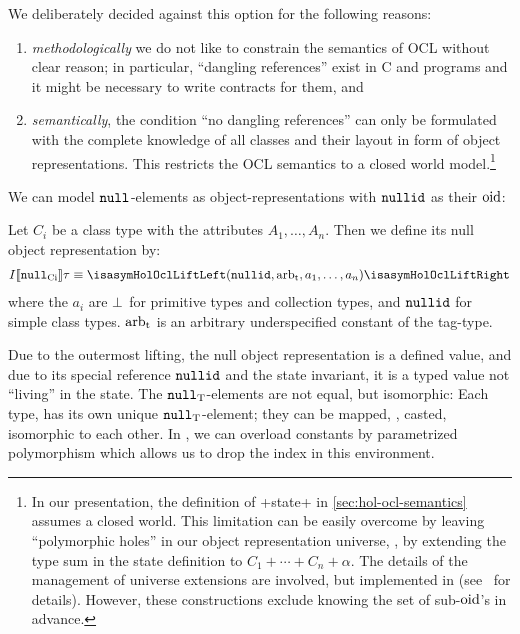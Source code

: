 We deliberately decided against this option for the following reasons:
\begin{enumerate}
\item \emph{methodologically} we do not like to constrain the semantics of OCL
  without clear reason; in particular, ``dangling references'' exist in C and
  \Cpp{} programs and it might be necessary to write contracts for them, and
\item \emph{semantically}, the condition ``no dangling references'' can only be
  formulated with the complete knowledge of all classes and their layout in
  form of object representations.  This restricts the OCL semantics to a closed
  world model.\footnote{In our presentation, the definition of \inlineocl+state+
    in \autoref{sec:hol-ocl-semantics} assumes a closed world. This limitation
    can be easily overcome by leaving ``polymorphic holes'' in our object
    representation universe, \ie, by extending the type sum in the state
    definition to $C_1 + \cdots + C_n + \alpha$.  The details of the management
    of universe extensions are involved, but implemented in \holocl
    (see~\cite{brucker.ea:extensible:2008-b} for details). However, these
    constructions exclude knowing the set of sub-$\mathrm{oid}$'s in advance.}
\end{enumerate} We can model ${\mathtt{null}_\text{{}}}$-elements as object-representations
with $\mathtt{nullid}$ as their $\mathrm{oid}$:
\begin{definition}
  Let $C_i$ be a class type with the attributes $A_1, \ldots, A_n$. Then we
  define its null object representation by:
  \begin{gather*}
    I\semantics{\Null{Ci}}\tau \equiv \lift{(\nullid, \Tag{arb}, a_1, \ldots,
    a_n )}
  \end{gather*}
  where the $a_i$ are $\bot$ for primitive types and collection
  types, and $\mathtt{nullid}$ for simple class types. $\mathrm{arb}_{\text{t}}$ is an arbitrary
  underspecified constant of the tag-type.
\end{definition}

Due to the outermost lifting, the null object representation is a defined value,
and due to its special reference $\mathtt{nullid}$ and the state invariant, it is a
typed value not ``living'' in the state.  The ${\mathtt{null}_\text{{T}}}$-elements are not equal,
but isomorphic: Each type, has its own unique ${\mathtt{null}_\text{{T}}}$-element; they can be
mapped, \ie, casted, isomorphic to each other. In \holocl, we can overload
constants by parametrized polymorphism which allows us to drop the index in this
environment.

